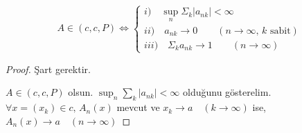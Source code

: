 \begin{theorem}
$$A\in(c,c,P)\iff
\begin{cases}
i)\quad\sup_n\Sigma_k|a_{nk}|<\infty\\
ii)\quad a_{nk}\to 0\qquad(n\to\infty,\,k\text{ sabit})\\
iii)\quad \Sigma_ka_{nk}\to 1\qquad(n\to\infty)
\end{cases}
$$
\end{theorem}
\begin{proof}
Şart gerektir.

$A\in(c,c,P)$ olsun. $\sup_n\sum\limits_k|a_{nk}|<\infty$ olduğunu gösterelim. \\[5pt]

$\forall x=(x_k)\in c,\,A_n(x)$ mevcut ve $x_k\to a\quad(k\to\infty)$ ise,\\ $A_n(x)\to a\quad(n\to\infty)$


\end{proof}
